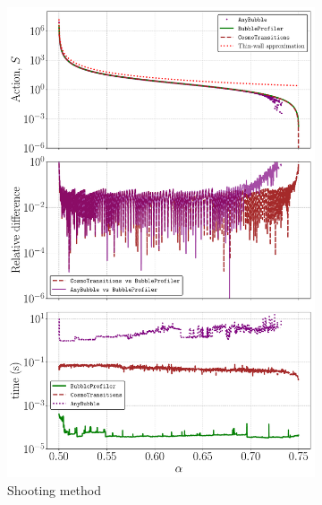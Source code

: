 \documentclass[final,3p,11pt,pdflatex]{elsarticle}
\begin{document}
\begin{figure}[h!]
\centering
  \begin{subfigure}[b]{0.49\textwidth}
    \includegraphics[width=\textwidth]{figures/alpha_tests_shooting.pdf}
    \caption{Shooting method}
    \label{fig:alpha_tests_shooting}
  \end{subfigure}
  \begin{subfigure}[b]{0.49\textwidth}

\end{subfigure}
\end{figure}
\end{document}
